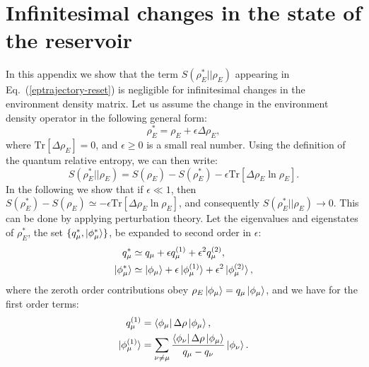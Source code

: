 \documentclass[aps,prx,twocolumn,showpacs,floatfix,superscriptaddress,graphics,longbibliography]{revtex4-1}
\newcommand{\tr}{\mathrm{Tr}}
\begin{document}
\appendix

\section{Infinitesimal changes in the state of the reservoir} \label{appA}

In this appendix we show that the term $S(\rho_E^\ast || \rho_E)$ appearing in Eq.~(\ref{eptrajectory-reset}) is negligible for infinitesimal changes in the environment density matrix. 
Let us assume the change in the environment density operator in the following general form: 
\begin{equation}
 \rho_E^\ast = \rho_E + \epsilon \Delta \rho_E,
\end{equation}
where $\tr[\Delta \rho_E] = 0$, and $\epsilon \geq 0$ is a small real number. Using the definition of the quantum relative entropy, we can then write:
\begin{equation} \label{rel-ent}
 S(\rho_E^\ast || \rho_E) =  S(\rho_E) - S(\rho_E^\ast) - \epsilon \tr[\Delta \rho_E \ln \rho_E].
\end{equation}
In the following we show that if $\epsilon \ll 1$, then $S(\rho_E^\ast) - S(\rho_E) \simeq - \epsilon \tr[\Delta \rho_E \ln \rho_E]$, and consequently $S(\rho_E^\ast || \rho_E) \rightarrow 0$.
This can be done by applying perturbation theory. Let the eigenvalues and eigenstates of $\rho_E^\ast$, the set $\{q_\mu^\ast, \ket{\phi_\mu^\ast}\}$, be expanded to second order in $\epsilon$:
\begin{align}
 q_\mu^\ast  &\simeq q_\mu + \epsilon q_\mu^{(1)} + \epsilon^2 q_\mu^{(2)},   \\
 \ket{\phi_\mu^\ast} &\simeq \ket{\phi_\mu} + \epsilon \ket{\phi_\mu^{(1)}} + \epsilon^2 \ket{\phi_\mu^{(2)}}, 
\end{align}
where the zeroth order contributions obey $\rho_E \ket{\phi_\mu} = q_\mu \ket{\phi_\mu}$, and we have for the first order terms:
\begin{align}
 q_\mu^{(1)} &= \bra{\phi_\mu} \Delta \rho \ket{\phi_\mu},  \\
 \ket{\phi_\mu^{(1)}} &= \sum_{\nu \neq \mu} \frac{\bra{\phi_\nu} \Delta \rho \ket{\phi_\mu}}{q_\mu - q_\nu} \ket{\phi_\nu}. 
\end{align}
\end{document}
